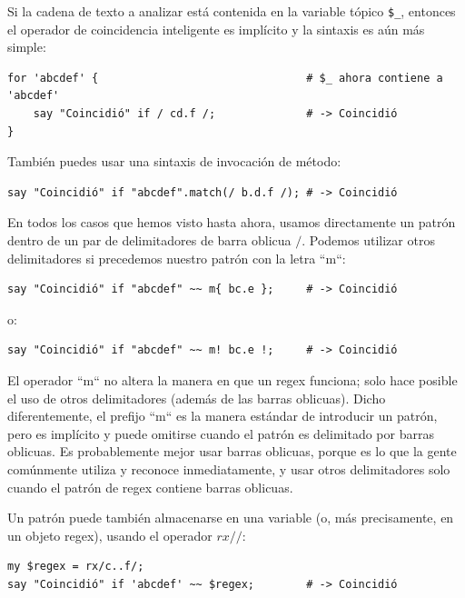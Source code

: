 Si la cadena de texto a analizar está contenida en la 
variable tópico \verb|$_|, entonces el operador de coincidencia
inteligente es implícito y la sintaxis es aún más simple:

\begin{lstlisting}
for 'abcdef' {                                # $_ ahora contiene a 'abcdef'
    say "Coincidió" if / cd.f /;              # -> Coincidió
}
\end{lstlisting}
%

También puedes usar una sintaxis de invocación de método:
\begin{lstlisting}
say "Coincidió" if "abcdef".match(/ b.d.f /); # -> Coincidió
\end{lstlisting}
%

En todos los casos que hemos visto hasta ahora, usamos 
directamente un patrón dentro de un par de delimitadores de barra
oblicua $/$. Podemos utilizar otros delimitadores si precedemos
nuestro patrón con la letra ``m``:

\begin{lstlisting}
say "Coincidió" if "abcdef" ~~ m{ bc.e };     # -> Coincidió
\end{lstlisting}
%

o:
\begin{lstlisting}
say "Coincidió" if "abcdef" ~~ m! bc.e !;     # -> Coincidió
\end{lstlisting}
%

El operador ``m`` no altera la manera en que un regex funciona;
solo hace posible el uso de otros delimitadores (además de las
barras oblicuas). Dicho diferentemente, el prefijo ``m`` es la
manera estándar de introducir un patrón, pero es implícito y 
puede omitirse cuando el patrón es delimitado por barras oblicuas.
Es probablemente mejor usar barras oblicuas, porque es lo que la
gente comúnmente utiliza y reconoce inmediatamente, y usar otros
delimitadores solo cuando el patrón de regex contiene barras
oblicuas.

Un patrón puede también almacenarse en una variable (o, más
precisamente, en un objeto regex), usando el operador $rx//$:

\begin{lstlisting}
my $regex = rx/c..f/;
say "Coincidió" if 'abcdef' ~~ $regex;        # -> Coincidió
\end{lstlisting}
%


